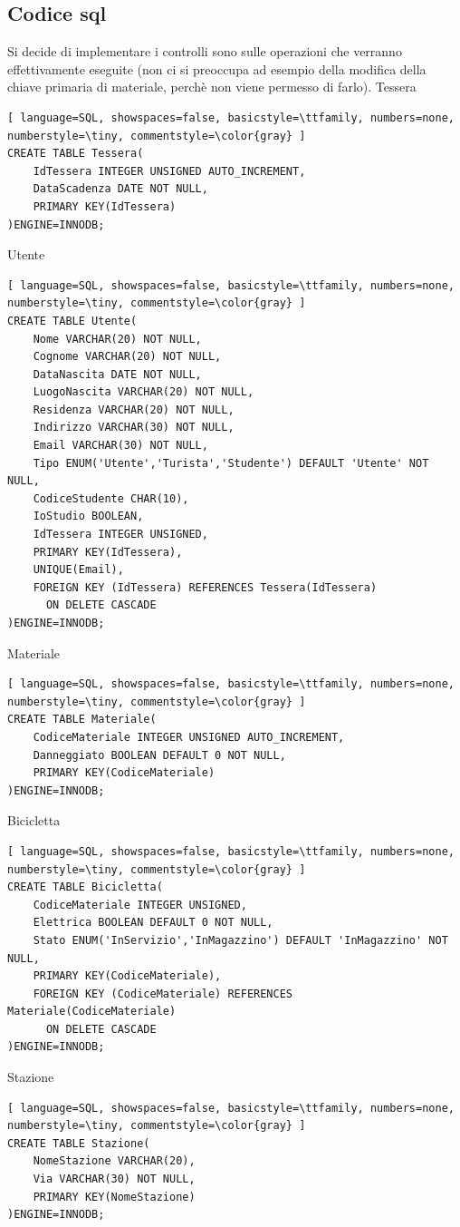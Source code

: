 \documentclass[a4paper,twoside]{article}
\begin{document}
\subsection{Codice sql}
Si decide di implementare i controlli sono sulle operazioni che verranno effettivamente eseguite (non ci si preoccupa ad esempio della modifica della chiave primaria di materiale, perchè non viene permesso di farlo).\newline
Tessera
\begin{lstlisting}[ language=SQL, showspaces=false, basicstyle=\ttfamily, numbers=none, numberstyle=\tiny, commentstyle=\color{gray} ]
CREATE TABLE Tessera(
	IdTessera INTEGER UNSIGNED AUTO_INCREMENT,
	DataScadenza DATE NOT NULL,
	PRIMARY KEY(IdTessera)
)ENGINE=INNODB;
\end{lstlisting}
Utente
\begin{lstlisting}[ language=SQL, showspaces=false, basicstyle=\ttfamily, numbers=none, numberstyle=\tiny, commentstyle=\color{gray} ]
CREATE TABLE Utente(
	Nome VARCHAR(20) NOT NULL,
	Cognome VARCHAR(20) NOT NULL,
	DataNascita DATE NOT NULL,
	LuogoNascita VARCHAR(20) NOT NULL,
	Residenza VARCHAR(20) NOT NULL,
	Indirizzo VARCHAR(30) NOT NULL,
	Email VARCHAR(30) NOT NULL,
	Tipo ENUM('Utente','Turista','Studente') DEFAULT 'Utente' NOT NULL,
	CodiceStudente CHAR(10),
	IoStudio BOOLEAN,
	IdTessera INTEGER UNSIGNED,
	PRIMARY KEY(IdTessera),
	UNIQUE(Email),
	FOREIGN KEY (IdTessera) REFERENCES Tessera(IdTessera)
	  ON DELETE CASCADE
)ENGINE=INNODB;
\end{lstlisting}
Materiale
\begin{lstlisting}[ language=SQL, showspaces=false, basicstyle=\ttfamily, numbers=none, numberstyle=\tiny, commentstyle=\color{gray} ]
CREATE TABLE Materiale(
	CodiceMateriale INTEGER UNSIGNED AUTO_INCREMENT,
	Danneggiato BOOLEAN DEFAULT 0 NOT NULL,
	PRIMARY KEY(CodiceMateriale)
)ENGINE=INNODB;
\end{lstlisting}
Bicicletta
\begin{lstlisting}[ language=SQL, showspaces=false, basicstyle=\ttfamily, numbers=none, numberstyle=\tiny, commentstyle=\color{gray} ]
CREATE TABLE Bicicletta(
	CodiceMateriale INTEGER UNSIGNED,
	Elettrica BOOLEAN DEFAULT 0 NOT NULL,
	Stato ENUM('InServizio','InMagazzino') DEFAULT 'InMagazzino' NOT NULL,
	PRIMARY KEY(CodiceMateriale),
	FOREIGN KEY (CodiceMateriale) REFERENCES Materiale(CodiceMateriale)
	  ON DELETE CASCADE
)ENGINE=INNODB;
\end{lstlisting}
Stazione
\begin{lstlisting}[ language=SQL, showspaces=false, basicstyle=\ttfamily, numbers=none, numberstyle=\tiny, commentstyle=\color{gray} ]
CREATE TABLE Stazione(
	NomeStazione VARCHAR(20),
	Via VARCHAR(30) NOT NULL,
	PRIMARY KEY(NomeStazione)
)ENGINE=INNODB;
\end{lstlisting}
\end{document}
